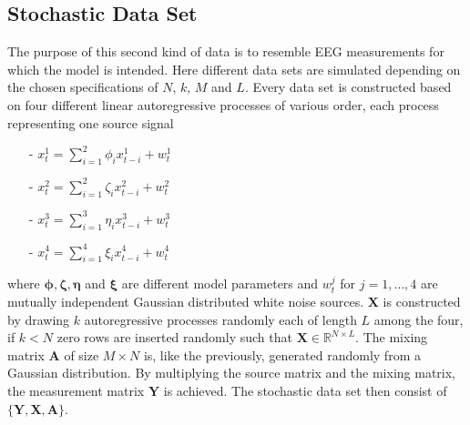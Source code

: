 \subsection{Stochastic Data Set}\label{sec:stoch_data}
The purpose of this second kind of data is to resemble EEG measurements for which the model is intended. 
Here different data sets are simulated depending on the chosen specifications of $N$, $k$, $M$ and $L$. 
Every data set is constructed based on four different linear autoregressive processes of various order, each process representing one source signal
\begin{itemize}
\item[-] $x_{t}^{1} = \sum_{i=1}^{2} \phi_i x_{t-i}^{1} + w_t^{1}$
\item[-] $x_{t}^{2} = \sum_{i=1}^{2} \zeta_i x_{t-i}^{2} + w_t^{2}$
\item[-] $x_{t}^{3} = \sum_{i=1}^{3} \eta_i x_{t-i}^{3} + w_t^{3}$
\item[-] $x_{t}^{4} = \sum_{i=1}^{4} \xi_i x_{t-i}^{4} + w_t^{4}$
\end{itemize}
where $\boldsymbol{\phi}, \boldsymbol{\zeta}, \boldsymbol{\eta}$ and $\boldsymbol{\xi}$ are different model parameters and $w_t^{j}$ for $j = 1,\hdots ,4$ are mutually independent Gaussian distributed white noise sources.
$\mathbf{X}$ is constructed by drawing $k$ autoregressive processes randomly each of length $L$ among the four, if $k < N$ zero rows are inserted randomly such that $\mathbf{X} \in \mathbb{R}^{N \times L}$.  
The mixing matrix $\mathbf{A}$ of size $M \times N$ is, like the previously, generated randomly from a Gaussian distribution.
By multiplying the source matrix and the mixing matrix, the measurement matrix $\mathbf{Y}$ is achieved.
The stochastic data set then consist of $\{ \mathbf{Y}, \mathbf{X}, \mathbf{A} \}$. 

